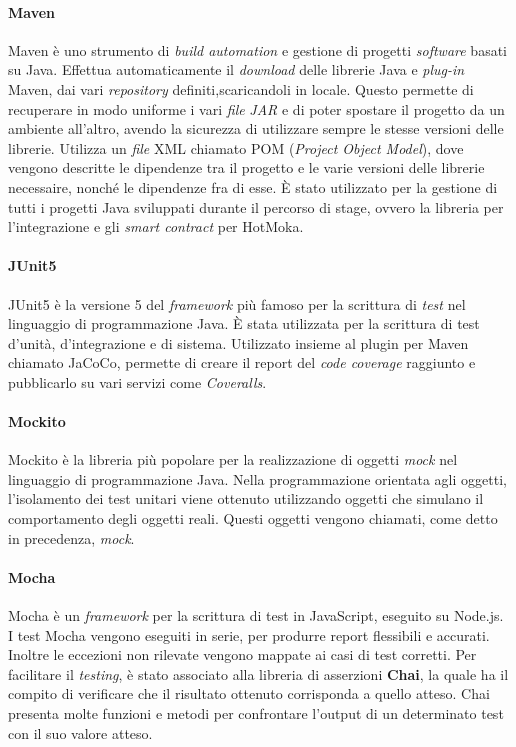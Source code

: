 \paragraph{Maven}
Maven è uno strumento di \textit{build automation} e gestione di progetti \textit{software} basati su Java. Effettua automaticamente il \textit{download} delle librerie Java e \textit{plug-in} Maven, dai vari \textit{repository} definiti,scaricandoli in locale. Questo permette di recuperare in modo uniforme i vari \textit{file} \textit{JAR} e di poter spostare il progetto da un ambiente all'altro, avendo la sicurezza di utilizzare sempre le stesse versioni delle librerie. Utilizza un \textit{file} XML chiamato POM (\textit{Project Object Model}), dove vengono descritte le dipendenze tra il progetto e le varie versioni delle librerie necessaire, nonché le dipendenze fra di esse. È stato utilizzato per la gestione di tutti i progetti Java sviluppati durante il percorso di stage, ovvero la libreria per l'integrazione e gli \textit{smart contract} per HotMoka.

\paragraph{JUnit5}

JUnit5 è la versione 5 del \textit{framework} più famoso per la scrittura di \textit{test} nel linguaggio di programmazione Java. È stata utilizzata per la scrittura di test d'unità, d'integrazione e di sistema. Utilizzato insieme al plugin per Maven chiamato JaCoCo, permette di creare il report del \textit{code coverage} raggiunto e pubblicarlo su vari servizi come \textit{Coveralls}.

\paragraph{Mockito}
Mockito è la libreria più popolare per la realizzazione di oggetti \textit{mock} nel linguaggio di programmazione Java. Nella programmazione orientata agli oggetti, l'isolamento dei test unitari viene ottenuto utilizzando oggetti che simulano il comportamento degli oggetti reali. Questi oggetti vengono chiamati, come detto in precedenza, \textit{mock}.

\paragraph{Mocha}
Mocha è un \textit{framework} per la scrittura di test in JavaScript, eseguito su Node.js. I test Mocha vengono eseguiti in serie, per produrre report flessibili e accurati. Inoltre le eccezioni non rilevate vengono mappate ai casi di test corretti. Per facilitare il \textit{testing}, è stato associato alla libreria di asserzioni \textbf{Chai}, la quale ha il compito di verificare che il risultato ottenuto corrisponda a quello atteso. Chai presenta molte funzioni e metodi per confrontare l'output di un determinato test con il suo valore atteso.

